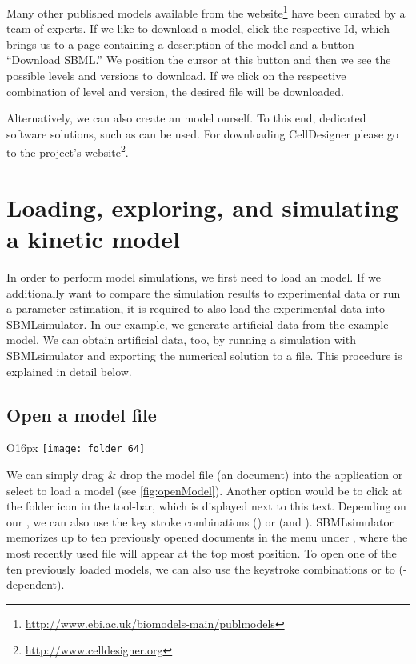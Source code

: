 Many other published models available from the \BioModels website\footnote{\url{http://www.ebi.ac.uk/biomodels-main/publmodels}} have been curated by a team of experts.
If we like to download a model, click the respective \ac{Id}, which brings us to a page containing a description of the model and a button ``Download SBML.'' 
We position the cursor at this button and then we see the possible \SBML levels and versions to download.
If we click on the respective combination of level and version, the desired \SBML file will be downloaded.

Alternatively, we can also create an \SBML model ourself.
To this end, dedicated software solutions, such as \CellDesigner \citep{Funahashi2008} can be used.
For downloading CellDesigner please go to the project's website\footnote{\url{http://www.celldesigner.org}}.

\section{Loading, exploring, and simulating a kinetic model}

In order to perform model simulations, we first need to load an \SBML model. 
If we additionally want to compare the simulation results to experimental data or run a parameter estimation, it is required to also load the experimental data into SBMLsimulator.
In our example, we generate artificial data from the example model.
We can obtain artificial data, too, by running a simulation with SBMLsimulator and exporting the numerical solution to a \CSV file.
This procedure is explained in detail below.

\subsection{Open a model file}
\begin{wrapfigure}{O}{16px}
\vspace{\wrapfigspace}
\texttt{[image: folder\_64]}
\end{wrapfigure}
We can simply drag \& drop the model file (an \SBML document) into the application or select   to load a model (see \cref{fig:openModel}).
Another option would be to click at the folder icon in the tool-bar, which is displayed next to this text.
Depending on our \OS, we can also use the key stroke combinations  (\MacOSX) or  (\Linux and \Windows).
SBMLsimulator memorizes up to ten previously opened \SBML documents in the menu under , where the most recently used file will appear at the top most position.
To open one of the ten previously loaded models, we can also use the keystroke combinations \keys{\Altmac} or  to  (\OS-dependent).

